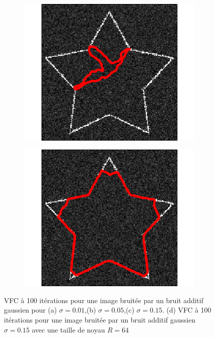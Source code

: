 \begin{appendices}
\begin{figure}[H]
\begin{subfigure}[c]{0.3\linewidth}
\includegraphics[width=\textwidth]{Chapters/Images/Noise/vfcg15}
\caption{}
\end{subfigure}
\begin{subfigure}[c]{0.3\linewidth}
\centering
\includegraphics[width=\textwidth]{Chapters/Images/Noise/vfcsmallkernel}
\caption{}
\end{subfigure}
\caption{VFC à 100 itérations pour une image bruitée par un bruit additif gaussien pour (a) $\sigma = 0.01$,(b) $\sigma = 0.05$,(c) $\sigma = 0.15$. (d) VFC à 100 itérations pour une image bruitée par un bruit additif gaussien $\sigma=0.15$ avec une taille de noyau $R=64$}
\end{figure}

\end{appendices}